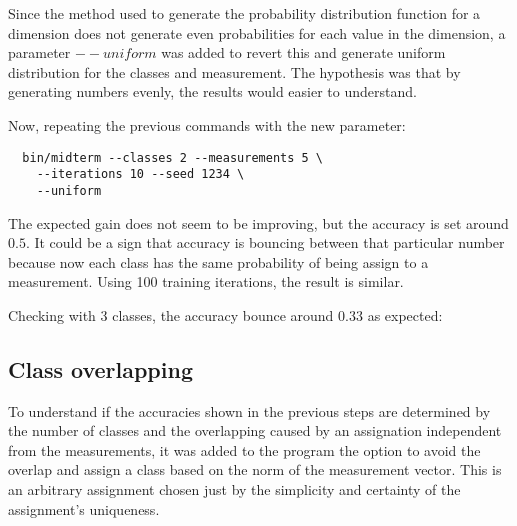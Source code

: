 \documentclass[letterpaper, conference]{IEEEtran}
\begin{document}
Since the method used to generate the probability distribution function for a dimension does not generate even probabilities for each value in the dimension, a parameter $--uniform$ was added to revert this and generate uniform distribution for the classes and measurement. The hypothesis was that by generating numbers evenly, the results would easier to understand.

Now, repeating the previous commands with the new parameter:

\begin{verbatim}
  bin/midterm --classes 2 --measurements 5 \
    --iterations 10 --seed 1234 \
    --uniform
\end{verbatim}

\begin{figure}[hbt]
  \label{fig:10-training-2-classes-uniform}
  
  \caption{}
\end{figure}

The expected gain does not seem to be improving, but the accuracy is set around $0.5$. It could be a sign that accuracy is bouncing between that particular number because now each class has the same probability of being assign to a measurement. Using 100 training iterations, the result is similar.

\begin{figure}[hbt]
  \label{fig:100-training-2-classes-uniform}
  
  \caption{}
\end{figure}

Checking with 3 classes, the accuracy bounce around $0.33$ as expected:

\begin{figure}[hbt]
  \label{fig:10-training-3-classes-uniform}
  
  \caption{}
\end{figure}

\subsection{Class overlapping}

To understand if the accuracies shown in the previous steps are determined by the number of classes and the overlapping caused by an assignation independent from the measurements, it was added to the program the option to avoid the overlap and assign a class based on the norm of the measurement vector. This is an arbitrary assignment chosen just by the simplicity and certainty of the assignment's uniqueness.
\end{document}
